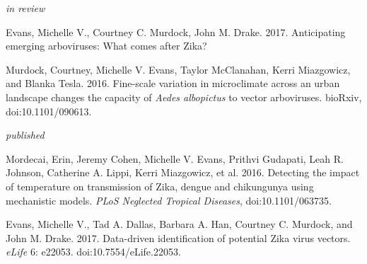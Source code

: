 

\begin{cvitems}

\bigskip
\smallskip
\textit{in review}
\smallskip
\item \textcolor{awesome}{Evans, Michelle V.}, Courtney C. Murdock, John M. Drake. 2017. Anticipating emerging arboviruses: What comes after Zika?

\item Murdock, Courtney, \textcolor{awesome}{Michelle V. Evans}, Taylor McClanahan, Kerri Miazgowicz, and Blanka Tesla. 2016. Fine-scale variation in microclimate across an urban landscape changes the capacity of \textit{Aedes albopictus} to vector arboviruses. bioRxiv, doi:10.1101/090613.


\bigskip
\textit{published}
\smallskip
\item Mordecai, Erin, Jeremy Cohen, \textcolor{awesome}{Michelle V. Evans}, Prithvi Gudapati, Leah R. Johnson, Catherine A. Lippi, Kerri Miazgowicz, et al. 2016. Detecting the impact of temperature on transmission of Zika, dengue and chikungunya using mechanistic models. \textit{PLoS Neglected Tropical Diseases}, doi:10.1101/063735.

\item \textcolor{awesome}{Evans, Michelle V.}, Tad A. Dallas, Barbara A. Han, Courtney C. Murdock, and John M. Drake. 2017. Data-driven identification of potential Zika virus vectors. \textit{eLife} 6: e22053. doi:10.7554/eLife.22053.

\bigskip
\end{cvitems}
